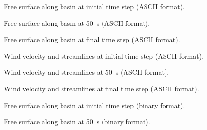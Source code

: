 \begin{figure}[H]
 \centering
 \caption{Free surface along basin at initial time step (ASCII format).}
 \label{t2d:windtxy:fig:FreeSurf0}
\end{figure}

\begin{figure}[H]
 \centering
 \caption{Free surface along basin at 50~s (ASCII format).}
 \label{t2d:windtxy:fig:FreeSurf50s}
\end{figure}

\begin{figure}[H]
 \centering
 \caption{Free surface along basin at final time step (ASCII format).}
 \label{t2d:windtxy:fig:FreeSurftf}
\end{figure}

\begin{figure}[H]
 \centering
 \caption{Wind velocity and streamlines at initial time step (ASCII format).}
 \label{t2d:windtxy:fig:Velo0}
\end{figure}

\begin{figure}[H]
 \centering
 \caption{Wind velocity and streamlines at 50~s (ASCII format).}
 \label{t2d:windtxy:fig:Velo50s}
\end{figure}

\begin{figure}[H]
 \centering
 \caption{Wind velocity and streamlines at final time step (ASCII format).}
 \label{t2d:windtxy:fig:Velotf}
\end{figure}

\begin{figure}[H]
 \centering
 \caption{Free surface along basin at initial time step (binary format).}
 \label{t2d:windtxy:fig:FreeSurfbin0}
\end{figure}

\begin{figure}[H]
 \centering
 \caption{Free surface along basin at 50~s (binary format).}
 \label{t2d:windtxy:fig:FreeSurfbin50s}
\end{figure}

